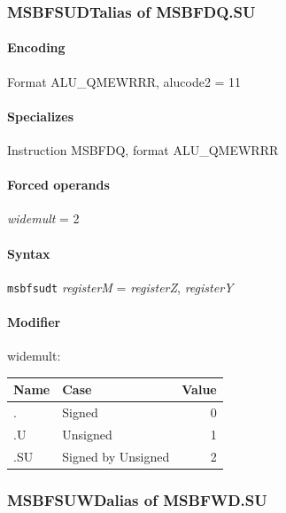 {\subsubsection[{\small MSBFSUDT: alias of MSBFDQ.SU}]{MSBFSUDT\hfill alias of MSBFDQ.SU}
\label{instr:MSBFSUDT}

\paragraph{Encoding} Format \textsf{ALU\_QMEWRRR, alucode2 = 11}\\



\paragraph{Specializes} Instruction MSBFDQ, format ALU\_QMEWRRR

\paragraph{Forced operands} \emph{widemult} = 2

\paragraph{Syntax} \texttt{msbfsudt} \emph{registerM} = \emph{registerZ}, \emph{registerY}

\paragraph{Modifier} \textsf{widemult}:\\

\noindent \begin{tabular}{|l|l|r|} \hline
\bf{Name} & \bf{Case} & \bf{Value} \\ \hline
. & Signed & 0 \\
.U & Unsigned & 1 \\
.SU & Signed by Unsigned & 2 \\
\hline \end{tabular}
\newpage
\subsubsection[{\small MSBFSUWD: alias of MSBFWD.SU}]{MSBFSUWD\hfill alias of MSBFWD.SU}
\label{instr:MSBFSUWD}

}
